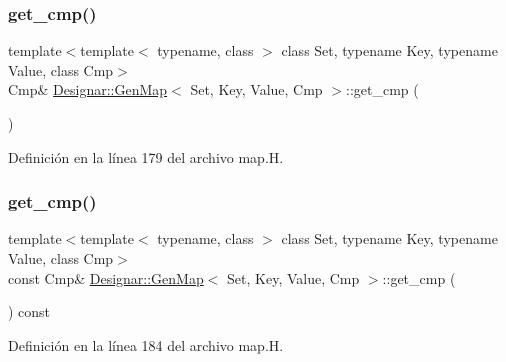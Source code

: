 \subsubsection{\texorpdfstring{get\+\_\+cmp()}{get\_cmp()}\hspace{0.1cm}{\footnotesize\ttfamily [1/2]}}
{\footnotesize\ttfamily template$<$template$<$ typename, class $>$ class Set, typename Key, typename Value, class Cmp$>$ \\
Cmp\& \hyperlink{class_designar_1_1_gen_map}{Designar\+::\+Gen\+Map}$<$ Set, Key, Value, Cmp $>$\+::get\+\_\+cmp (\begin{DoxyParamCaption}{ }\end{DoxyParamCaption})\hspace{0.3cm}{\ttfamily [inline]}}



Definición en la línea 179 del archivo map.\+H.

\mbox{\label{class_designar_1_1_gen_map_a81de02316324ed11c8a668fe2d35d2d3}} 
\subsubsection{\texorpdfstring{get\+\_\+cmp()}{get\_cmp()}\hspace{0.1cm}{\footnotesize\ttfamily [2/2]}}
{\footnotesize\ttfamily template$<$template$<$ typename, class $>$ class Set, typename Key, typename Value, class Cmp$>$ \\
const Cmp\& \hyperlink{class_designar_1_1_gen_map}{Designar\+::\+Gen\+Map}$<$ Set, Key, Value, Cmp $>$\+::get\+\_\+cmp (\begin{DoxyParamCaption}{ }\end{DoxyParamCaption}) const\hspace{0.3cm}{\ttfamily [inline]}}



Definición en la línea 184 del archivo map.\+H.

\mbox{\label{class_designar_1_1_gen_map_aaecc59b3f9c206d0d962bd1cd6bfc4d6}} 

